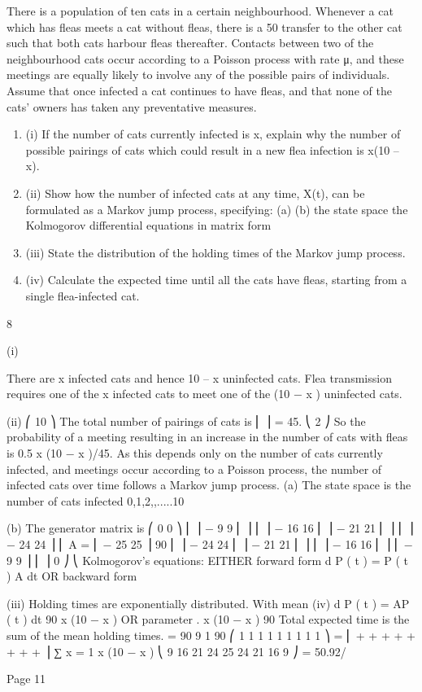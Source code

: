 \documentclass[a4paper,12pt]{article}
\begin{document}
There is a population of ten cats in a certain neighbourhood. Whenever a cat which
has fleas meets a cat without fleas, there is a 50%
transfer to the other cat such that both cats harbour fleas thereafter. Contacts between
two of the neighbourhood cats occur according to a Poisson process with rate μ, and
these meetings are equally likely to involve any of the possible pairs of individuals.
Assume that once infected a cat continues to have fleas, and that none of the cats’
owners has taken any preventative measures.
\begin{enumerate}
\item (i) If the number of cats currently infected is x, explain why the number of
possible pairings of cats which could result in a new flea infection is x(10 – x).
\item 
(ii) Show how the number of infected cats at any time, X(t), can be formulated as
a Markov jump process, specifying:
(a)
(b)
the state space
the Kolmogorov differential equations in matrix form
\item 
(iii) State the distribution of the holding times of the Markov jump process.
\item (iv) Calculate the expected time until all the cats have fleas, starting from a single
flea-infected cat.
\end{enumerate}

8
\item (i)

There are x infected cats and hence 10 – x uninfected cats.
Flea transmission requires one of the x infected cats to meet one of the (10 − x )
uninfected cats.
\item (ii)
⎛ 10 ⎞
The total number of pairings of cats is ⎜ ⎟ = 45.
⎝ 2 ⎠
So the probability of a meeting resulting in an increase in the number of cats
with fleas is 0.5 x (10 − x )/45.
As this depends only on the number of cats currently infected, and meetings
occur according to a Poisson process, the number of infected cats over time
follows a Markov jump process.
(a)
The state space is the number of cats infected {0,1,2,,.....10}

(b)
The generator matrix is
⎛ 0 0
⎞
⎜
⎟
− 9 9
⎜
⎟
⎜
⎟
− 16 16
⎜
⎟
− 21 21
⎜
⎟
⎜
⎟
− 24 24
⎟
\mu ⎜
A = ⎜
− 25 25
⎟
90 ⎜
⎟
− 24 24
⎜
⎟
− 21 21
⎜
⎟
⎜
⎟
− 16 16
⎜
⎟
⎜
− 9 9 ⎟
⎜
⎟
0 ⎠
⎝
Kolmogorov’s equations:
EITHER
forward form
d
P ( t ) = P ( t ) A
dt
OR
backward form
\item (iii)
Holding times are exponentially distributed.
With mean
(iv)
d
P ( t ) = AP ( t )
dt
90
\mu x (10 − x )
OR parameter
.
\mu x (10 − x )
90
Total expected time is the sum of the mean holding times.
=
90 9
1
90 ⎛ 1 1 1
1
1
1
1 1 1 ⎞
= ⎜ + + +
+
+
+ + + ⎟
∑
\mu x = 1 x (10 − x ) \mu ⎝ 9 16 21 24 25 24 21 16 9 ⎠
= 50.92/

\mu
Page 11%
\end{document}
